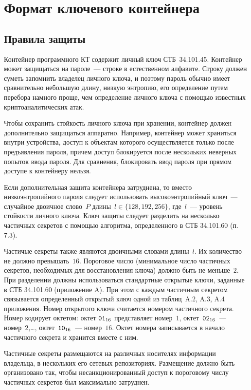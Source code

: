 \chapter{Формат ключевого контейнера}\label{CONT}

\section{Правила защиты}\label{CONT.Rules}

Контейнер программного КТ содержит личный ключ СТБ~34.101.45.
Контейнер может защищаться на пароле~--- строке в естественном алфавите. 
Строку должен суметь запомнить владелец личного ключа, и поэтому пароль 
обычно имеет сравнительно небольшую длину, низкую энтропию, его 
определение путем перебора намного проще, чем определение личного ключа с 
помощью известных криптоаналитических атак. 

Чтобы сохранить стойкость личного ключа при хранении, контейнер должен
дополнительно защищаться аппаратно. Например, контейнер может храниться
внутри устройства, доступ к объектам которого осуществляется только после 
предъявления пароля, причем доступ блокируется после нескольких неверных 
попыток ввода пароля. Для сравнения, блокировать ввод пароля при прямом 
доступе к контейнеру нельзя.  

Если дополнительная защита контейнера затруднена, то вместо 
низкоэнтропийного пароля следует использовать высокоэнтропийный ключ~--- 
случайное двоичное слово~$P$ длины~$l\in\{128,192,256\}$, где~$l$~--- 
уровень стойкости личного ключа.  
%
Ключ защиты следует разделить на несколько частичных секретов с помощью 
алгоритма, определенного в СТБ 34.101.60 (п. 7.3). 

Частичые секреты также являются двоичными словами длины~$l$. Их количество не 
должно превышать~$16$. Пороговое число (минимальное число частичных секретов,
необходимых для восстановления ключа) должно быть не меньше~$2$.
%
При разделении должны использоваться стандартные открытые 
ключи, заданные в СТБ 34.101.60 (приложение A). При этом с каждым 
частичным секретом связывается определенный открытый ключ одной из 
таблиц~A.2, A.3, A.4 приложения.  
%
Номер открытого ключа считается номером частичного секрета.
Номер кодирует октетом: октет $\texttt{01}_{16}$ представляет номер~$1$, 
октет~$\texttt{02}_{16}$~--- номер~$2$,\ldots, октет~$\texttt{10}_{16}$~--- номер~$16$.
Октет номера записывается в начало частичного секрета и хранится вместе с 
ним.

Частичные секреты размещаются на различных носителях информации 
владельца, в нескольких его сетевых репозиториях. 
%
Размещение должно быть организовано так, чтобы несанкционированный 
доступ к пороговому числу частичных секретов был максимально затруднен.

